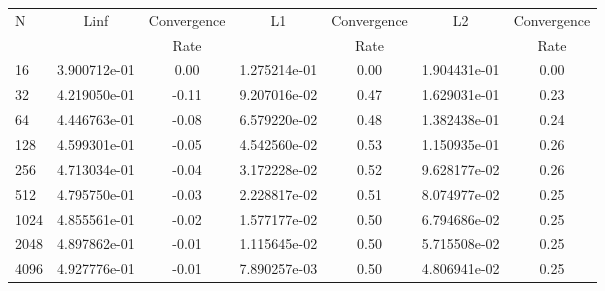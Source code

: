 \documentclass[12pt]{article}
\begin{document}
	\begin{tabular}{l|c|c|c|c|c|c}
		N&Linf&Convergence&L1&Convergence&L2&Convergence\\
		&&Rate&&Rate&&Rate\\
		\hline
		16&3.900712e-01&0.00&1.275214e-01&0.00&1.904431e-01&0.00\\
		\hline
		32&4.219050e-01&-0.11&9.207016e-02&0.47&1.629031e-01&0.23\\
		\hline
		64&4.446763e-01&-0.08&6.579220e-02&0.48&1.382438e-01&0.24\\
		\hline
		128&4.599301e-01&-0.05&4.542560e-02&0.53&1.150935e-01&0.26\\
		\hline
		256&4.713034e-01&-0.04&3.172228e-02&0.52&9.628177e-02&0.26\\
		\hline
		512&4.795750e-01&-0.03&2.228817e-02&0.51&8.074977e-02&0.25\\
		\hline
		1024&4.855561e-01&-0.02&1.577177e-02&0.50&6.794686e-02&0.25\\
		\hline
		2048&4.897862e-01&-0.01&1.115645e-02&0.50&5.715508e-02&0.25\\
		\hline
		4096&4.927776e-01&-0.01&7.890257e-03&0.50&4.806941e-02&0.25\\
	\end{tabular}
\end{document}
